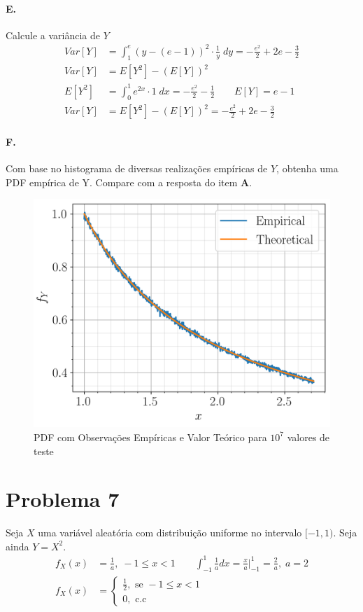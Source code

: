 \documentclass{article}
\begin{document}
\paragraph*{E.} Calcule a variância de $Y$
\begin{align*}
    Var[Y] &= \int_1^e (y - (e-1))^2 \cdot \frac{1}{y} \; dy = -\frac{e^2}{2} + 2e - \frac{3}{2} \\
    Var[Y] &= E[Y^2] - (E[Y])^2 \\
    E[Y^2] &= \int_0^1 e^{2x} \cdot 1 \; dx = -\frac{e^2}{2} - \frac{1}{2} \qquad E[Y] = e - 1 \\
    Var[Y] &= E[Y^2] - (E[Y])^2 = -\frac{e^2}{2} + 2e - \frac{3}{2}
\end{align*}

\paragraph*{F.} Com base no histograma de diversas realizações empíricas de $Y$, obtenha uma PDF
empírica de Y. Compare com a resposta do item \textbf{A}.

\begin{figure}[H]
    \centering
    \caption{PDF com Observações Empíricas e Valor Teórico para $10^7$ valores de teste}
    \includegraphics[width=0.8\linewidth]{py/6f.png}
\end{figure}

\section*{Problema 7}
Seja $X$ uma variável aleatória com distribuição uniforme no intervalo $[-1,1)$. Seja ainda $Y =
X^2$.
\begin{align*}
    f_X(x) &= \frac{1}{a}, \; -1 \le x < 1 \qquad \int_{-1}^1 \frac{1}{a} dx = \frac{x}{a}
\bigg\rvert_{-1}^{1} = \frac{2}{a}, \; a = 2\\
    f_X(x) &=
    \begin{cases}
        \frac{1}{2}, \text{ se } -1 \le x < 1 \\
        0, \text{ c.c}
    \end{cases}
\end{align*}
\end{document}
